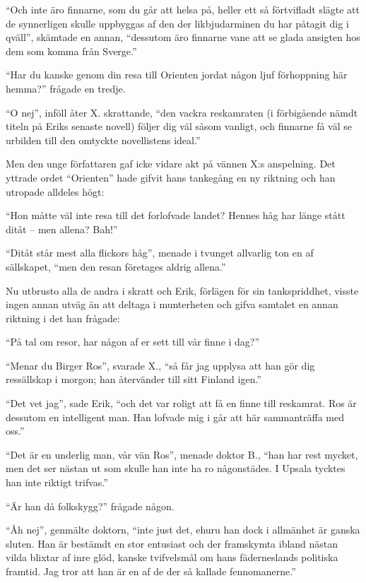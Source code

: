 ``Och inte äro finnarne, som du går att helsa på, heller ett så
förtvifladt slägte att de synnerligen skulle uppbyggas af den der
likbjudarminen du har påtagit dig i qväll'', skämtade en annan,
``dessutom äro finnarne vane att se glada ansigten hos dem som komma
från Sverge.''

``Har du kanske genom din resa till Orienten jordat någon ljuf
förhoppning här hemma?'' frågade en tredje.

``O nej'', inföll åter X. skrattande, ``den vackra reskamraten (i
förbigående nämdt titeln på Eriks senaste novell) följer dig väl såsom
vanligt, och finnarne få väl se urbilden till den omtyckte novellistens
ideal.''

Men den unge författaren gaf icke vidare akt på vännen X:s anspelning.
Det yttrade ordet ``Orienten'' hade gifvit hans tankegång en ny riktning
och han utropade alldeles högt:

``Hon måtte väl inte resa till det forlofvade landet? Hennes håg har
länge stått ditåt -- men allena? Bah!''

``Ditåt står mest alla flickors håg'', menade i tvunget allvarlig ton en
af sällskapet, ``men den resan företages aldrig allena.''

Nu utbrusto alla de andra i skratt och Erik, förlägen för sin
tankspriddhet, visste ingen annan utväg än att deltaga i munterheten och
gifva samtalet en annan riktning i det han frågade:

``På tal om resor, har någon af er sett till vår finne i dag?''

``Menar du Birger Ros'', svarade X., ``så får jag upplysa att han gör
dig ressällskap i morgon; han återvänder till sitt Finland igen.''

``Det vet jag'', sade Erik, ``och det var roligt att få en finne till
reskamrat. Ros är dessutom en intelligent man. Han lofvade mig i går att
här sammanträffa med oss.''

``Det är en underlig man, vår vän Ros'', menade doktor B., ``han har
rest mycket, men det ser nästan ut som skulle han inte ha ro
någonstädes. I Upsala tycktes han inte riktigt trifvas.''

``Är han då folkskygg?'' frågade någon.

``Åh nej'', genmälte doktorn, ``inte just det, ehuru han dock i
allmänhet är ganska sluten. Han är bestämdt en stor entusiast och der
framskymta ibland nästan vilda blixtar af inre glöd, kanske tvifvelsmål
om hans fäderneslands politiska framtid. Jag tror att han är en af de
der så kallade fennomanerne.''

